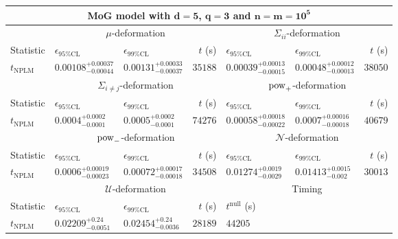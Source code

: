 \begin{tabular}{l|llr|llr}
	\toprule
	\multicolumn{7}{c}{{\bf MoG model with $\mathbf{d=5}$, $\mathbf{q=3}$ and $\mathbf{n=m=10^{5}}$}} \\
	\toprule
	\multicolumn{1}{c}{} & \multicolumn{3}{c}{$\mu$-deformation} & \multicolumn{3}{c}{$\Sigma_{ii}$-deformation} \\
	Statistic & $\epsilon_{95\%\mathrm{CL}}$ & $\epsilon_{99\%\mathrm{CL}}$ & $t$ (s) & $\epsilon_{95\%\mathrm{CL}}$ & $\epsilon_{99\%\mathrm{CL}}$ & $t$ (s) \\
	\midrule
	$t_{\mathrm{NPLM}}$ & $0.00108_{-0.00044}^{+0.00037}$ & $0.00131_{-0.00037}^{+0.00033}$ & $35188$ & $0.00039_{-0.00015}^{+0.00013}$ & $0.00048_{-0.00013}^{+0.00012}$ & $38050$ \\
	\toprule
	\multicolumn{1}{c}{} & \multicolumn{3}{c}{$\Sigma_{i\neq j}$-deformation} & \multicolumn{3}{c}{$\rm{pow}_{+}$-deformation} \\
	Statistic & $\epsilon_{95\%\mathrm{CL}}$ & $\epsilon_{99\%\mathrm{CL}}$ & $t$ (s) & $\epsilon_{95\%\mathrm{CL}}$ & $\epsilon_{99\%\mathrm{CL}}$ & $t$ (s) \\
	\midrule
	$t_{\mathrm{NPLM}}$ & $0.0004_{-0.0001}^{+0.0002}$ & $0.0005_{-0.0001}^{+0.0002}$ & $74276$ & $0.00058_{-0.00022}^{+0.00018}$ & $0.0007_{-0.00018}^{+0.00016}$ & $40679$ \\
	\toprule
	\multicolumn{1}{c}{} & \multicolumn{3}{c}{$\rm{pow}_{-}$-deformation} & \multicolumn{3}{c}{$\mathcal{N}$-deformation} \\
	Statistic & $\epsilon_{95\%\mathrm{CL}}$ & $\epsilon_{99\%\mathrm{CL}}$ & $t$ (s) & $\epsilon_{95\%\mathrm{CL}}$ & $\epsilon_{99\%\mathrm{CL}}$ & $t$ (s) \\
	\midrule
	$t_{\mathrm{NPLM}}$ & $0.0006_{-0.00023}^{+0.00019}$ & $0.00072_{-0.00018}^{+0.00017}$ & $34508$ & $0.01274_{-0.0029}^{+0.0019}$ & $0.01413_{-0.002}^{+0.0015}$ & $30013$ \\
	\toprule
	\multicolumn{1}{c}{} & \multicolumn{3}{c}{$\mathcal{U}$-deformation} & \multicolumn{3}{c}{Timing} \\
	Statistic & $\epsilon_{95\%\mathrm{CL}}$ & $\epsilon_{99\%\mathrm{CL}}$ & $t$ (s) & $t^{\mathrm{null}}$ (s) \\
	\midrule
	$t_{\mathrm{NPLM}}$ & $0.02209_{-0.0051}^{+0.24}$ & $0.02454_{-0.0036}^{+0.24}$ & $28189$ & $44205$ \\
	\bottomrule
\end{tabular}